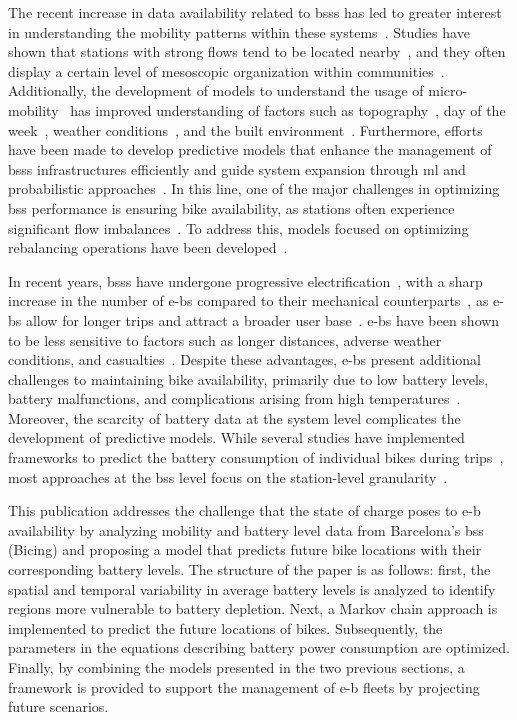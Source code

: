The recent increase in data availability related to \acp{bss} has led to greater interest in understanding the mobility patterns within these systems~\cite{Kou2019, Li2020}. Studies have shown that stations with strong flows tend to be located nearby~\cite{Chen2017}, and they often display a certain level of mesoscopic organization within communities~\cite{Zaltz2013}. Additionally, the development of models to understand the usage of micro-mobility~\cite{Tran2015} has improved understanding of factors such as topography~\cite{Kim2020}, day of the week~\cite{Tran2015}, weather conditions~\cite{ElAssi2017, Kim2018, Ashqar2019}, and the built environment~\cite{Tran2015}. Furthermore, efforts have been made to develop predictive models that enhance the management of \acp{bss} infrastructures efficiently and guide system expansion through \ac{ml} and probabilistic approaches~\cite{Singhvi2015, Li2015, Chen2016, Albuquerque2021, Yang2020graph, Almannaa2020}. In this line, one of the major challenges in optimizing \ac{bss} performance is ensuring bike availability, as stations often experience significant flow imbalances~\cite{Yang2016, Singla2015, FaghihImani2017Empirical}. To address this, models focused on optimizing rebalancing operations have been developed~\cite{Raviv2013, Dell2014, Dell2018, Chiariotti2018}.

In recent years, \acp{bss} have undergone progressive electrification~\cite{MeddinWorldMap2025, Galatoulas2020}, with a sharp increase in the number of \acp{e-b} compared to their mechanical counterparts~\cite{Galatoulas2020, Bielinski2020}, as \acp{e-b} allow for longer trips and attract a broader user base~\cite{Simsekoglu2019, Weinert2007}. \acp{e-b} have been shown to be less sensitive to factors such as longer distances, adverse weather conditions, and casualties~\cite{Wamburu2021, Campbell2016, Siman2018}. Despite these advantages, \acp{e-b} present additional challenges to maintaining bike availability, primarily due to low battery levels, battery malfunctions, and complications arising from high temperatures~\cite{Ji2014, Florez2018, Zhang2019, Usama2019}. Moreover, the scarcity of battery data at the system level complicates the development of predictive models. While several studies have implemented frameworks to predict the battery consumption of individual bikes during trips~\cite{Burani2022, Steyn2014}, most approaches at the \ac{bss} level focus on the station-level granularity~\cite{Zhou2023}.

This publication addresses the challenge that the state of charge poses to \ac{e-b} availability by analyzing mobility and battery level data from Barcelona's \ac{bss} (Bicing) and proposing a model that predicts future bike locations with their corresponding battery levels. The structure of the paper is as follows: first, the spatial and temporal variability in average battery levels is analyzed to identify regions more vulnerable to battery depletion. Next, a Markov chain approach is implemented to predict the future locations of bikes. Subsequently, the parameters in the equations describing battery power consumption are optimized. Finally, by combining the models presented in the two previous sections, a framework is provided to support the management of \ac{e-b} fleets by projecting future scenarios.